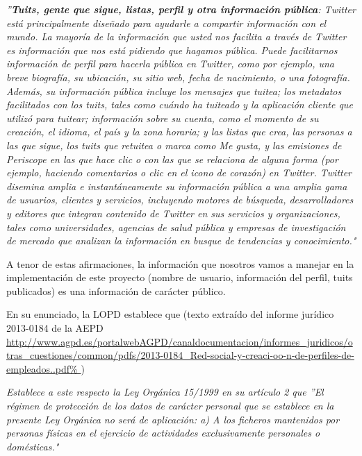 \leftskip=1cm
\rightskip=1cm
{\em ''{\bf Tuits, gente que sigue, listas, perfil y otra información pública}: Twitter está principalmente diseñado para ayudarle a 
compartir información con el mundo. La mayoría de la información que usted nos facilita a través de Twitter es información 
que nos está pidiendo que hagamos pública. Puede facilitarnos información de perfil para hacerla pública en Twitter, como por 
ejemplo, una breve biografía, su ubicación, su sitio web, fecha de nacimiento, o una fotografía. Además, su información pública 
incluye los mensajes que tuitea; los metadatos facilitados con los tuits, tales como cuándo ha tuiteado y la aplicación cliente 
que utilizó para tuitear; información sobre su cuenta, como el momento de su creación, el idioma, el país y la zona horaria; y las 
listas que crea, las personas a las que sigue, los tuits que retuitea o marca como Me gusta, y las emisiones de Periscope en las que 
hace clic o con las que se relaciona de alguna forma (por ejemplo, haciendo comentarios o clic en el icono de corazón) en Twitter. 
Twitter disemina amplia e instantáneamente su información pública a una amplia gama de usuarios, clientes y servicios, incluyendo 
motores de búsqueda, desarrolladores y editores que integran contenido de Twitter en sus servicios y organizaciones, tales como universidades, 
agencias de salud pública y empresas de investigación de mercado que analizan la información en busque de tendencias y conocimiento."}

\leftskip=0pt \rightskip=0pt



A tenor de estas afirmaciones, la información que nosotros vamos a manejar en la implementación de este proyecto
(nombre de usuario, información del perfil, tuits publicados)
es una información de carácter público. 

En su enunciado, la LOPD establece que
(texto extraído del informe jurídico  2013-0184 de la AEPD
\url{http://www.agpd.es/portalwebAGPD/canaldocumentacion/informes_juridicos/otras_cuestiones/common/pdfs/2013-0184_Red-social-y-creaci-oo-n-de-perfiles-de-empleados..pdf%
})

\leftskip=1cm
\rightskip=1cm
{\em Establece a este
respecto la Ley Orgánica 15/1999 en su artículo 2 que ''El régimen de
protección de los datos de carácter personal que se establece en la
presente Ley Orgánica no será de aplicación: a) A los ficheros
mantenidos por personas físicas en el ejercicio de actividades
exclusivamente personales o domésticas."
}


